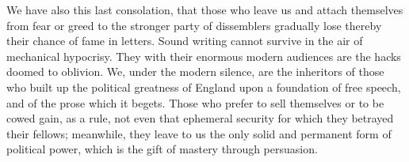 \documentclass{book}
\begin{document}
We have also this last consolation, that those who leave us and attach themselves from fear or greed to the stronger party of dissemblers gradually lose thereby their chance of fame in letters. Sound writing cannot survive in the air of mechanical hypocrisy. They with their enormous modern audiences are the hacks doomed to oblivion. We, under the modern silence, are the inheritors of those who built up the political greatness of England upon a foundation of free speech, and of the prose which it begets. Those who prefer to sell themselves or to be cowed gain, as a rule, not even that ephemeral security for which they betrayed their fellows; meanwhile, they leave to us the only solid and permanent form of political power, which is the gift of mastery through persuasion.
\end{document}
